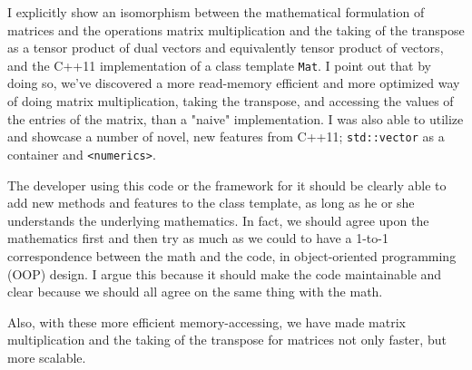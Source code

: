 \documentclass[10pt]{amsart}
\begin{document}
I explicitly show an isomorphism between the mathematical formulation of matrices and the operations matrix multiplication and the taking of the transpose as a tensor product of dual vectors and equivalently tensor product of vectors, and the C++11 implementation of a class template \verb|Mat|.  I point out that by doing so, we've discovered a more read-memory efficient and more optimized way of doing matrix multiplication, taking the transpose, and accessing the values of the entries of the matrix, than a "naive" implementation.  I was also able to utilize and showcase a number of novel, new features from C++11; \verb|std::vector| as a container and \verb|<numerics>|.  

The developer using this code or the framework for it should be clearly able to add new methods and features to the class template, as long as he or she understands the underlying mathematics.  In fact, we should agree upon the mathematics first and then try as much as we could to have a 1-to-1 correspondence between the math and the code, in object-oriented programming (OOP) design.  I argue this because it should make the code maintainable and clear because we should all agree on the same thing with the math.  

Also, with these more efficient memory-accessing, we have made matrix multiplication and the taking of the transpose for matrices not only faster, but more scalable.  




  
\end{document}
